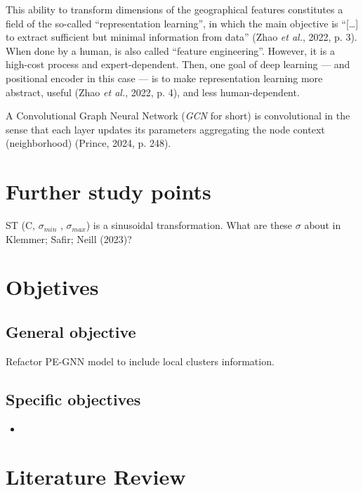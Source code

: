 \documentclass[12pt, a4paper, twoside]{article}
\numberwithin{equation}{subsection} %
\begin{document}
This ability to transform dimensions of the geographical features
constitutes a field of the so-called ``representation learning'', in
which the main objective is ``{[}\ldots{]} to extract sufficient but
minimal information from data'' (Zhao \emph{et al.}, 2022, p. 3). When
done by a human, is also called ``feature engineering''. However, it is
a high-cost process and expert-dependent. Then, one goal of deep
learning --- and positional encoder in this case --- is to make
representation learning more abstract, useful (Zhao \emph{et al.}, 2022,
p. 4), and less human-dependent.

A Convolutional Graph Neural Network (\emph{GCN} for short) is
convolutional in the sense that each layer updates its parameters
aggregating the node context (neighborhood) (Prince, 2024, p. 248).

\section{Further study points}\label{further-study-points}

ST (C, \(σ_{min}\) , \(σ_{max}\)) is a sinusoidal transformation. What
are these \(\sigma\) about in Klemmer; Safir; Neill (2023)?

\newpage

\section{Objetives}\label{objetives}

\subsection{General objective}\label{general-objective}

Refactor PE-GNN model to include local clusters information.

\subsection{Specific objectives}\label{specific-objectives}

\begin{itemize}
\item
  \newpage
\end{itemize}

\section{Literature Review}\label{literature-review}
\end{document}
